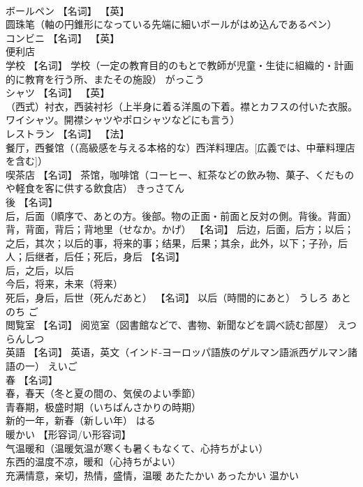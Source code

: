 \documentclass[8pt]{extreport}
\begin{document}
\begin{CJK}{UTF8}{min}
\\	ボールペン	【名词】 【英】
\\	圆珠笔（軸の円錐形になっている先端に細いボールがはめ込んであるペン）		
\\	コンビニ	【名词】 【英】
\\	便利店		
\\	学校	【名词】 学校（一定の教育目的のもとで教師が児童・生徒に組織的・計画的に教育を行う所、またその施設）	がっこう	
\\	シャツ	【名词】 【英】
\\	（西式）衬衣，西装衬衫（上半身に着る洋風の下着。襟とカフスの付いた衣服。ワイシャツ。開襟シャツやポロシャツなどにも言う）		
\\	レストラン	【名词】 【法】
\\	餐厅，西餐馆（（高級感を与える本格的な）西洋料理店。[広義では、中華料理店を含む]）		
\\	喫茶店	【名词】 茶馆，咖啡馆（コーヒー、紅茶などの飲み物、菓子、くだものや軽食を客に供する飲食店）	きっさてん	
\\	後	【名词】 
\\	后，后面（順序で、あとの方。後部。物の正面・前面と反対の側。背後。背面） 
\\	背，背面，背后；背地里（せなか。かげ） 【名词】 后边，后面，后方；以后；之后，其次；以后的事，将来的事；结果，后果；其余，此外，以下；子孙，后人；后继者，后任；死后，身后 【名词】 
\\	后，之后，以后 
\\	今后，将来，未来（将来） 
\\	死后，身后，后世（死んだあと） 【名词】 以后（時間的にあと）	うしろ あと のち ご	
\\	閲覧室	【名词】 阅览室（図書館などで、書物、新聞などを調べ読む部屋）	えつらんしつ	
\\	英語	【名词】 英语，英文（インド‐ヨーロッパ語族のゲルマン語派西ゲルマン諸語の一）	えいご	
\\	春	【名词】 
\\	春，春天（冬と夏の間の、気侯のよい季節） 
\\	青春期，极盛时期（いちばんさかりの時期） 
\\	新的一年，新春（新しい年）	はる	
\\	暖かい	【形容词/い形容词】 
\\	气温暖和（温暖気温が寒くも暑くもなくて、心持ちがよい） 
\\	东西的温度不凉，暖和（心持ちがよい） 
\\	充满情意，亲切，热情，盛情，温暖	あたたかい あったかい	温かい

\end{CJK}
\end{document}
